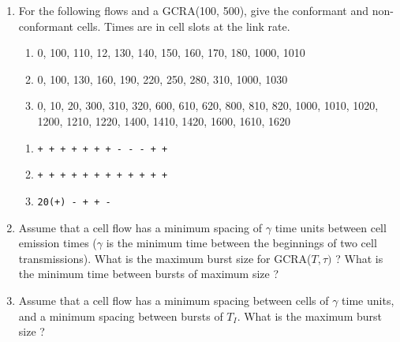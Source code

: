 \begin{problem}
\begin{enumerate}
        \item For the following flows and a GCRA(100, 500), give the conformant and
  non-conformant cells. Times are in cell slots at the link rate.
  \begin{enumerate}
        \item  0, 100, 110, 12, 130, 140, 150, 160, 170, 180, 1000, 1010
        \item  0, 100, 130, 160, 190, 220, 250, 280, 310, 1000, 1030
        \item  0, 10, 20, 300, 310, 320, 600, 610, 620, 800, 810, 820, 1000,
        1010, 1020, 1200, 1210, 1220, 1400, 1410, 1420, 1600, 1610, 1620
    \end{enumerate}

   \ifsol
        \begin{enumerate}
        \item  \texttt{+ + + + + + + - - - + +}
        \item  \texttt{+ + + + + + + + + + + +}
        \item  \texttt{20(+) - + + -}
        \end{enumerate}
\fi

        \item Assume that a cell flow has a minimum spacing of $\gamma$
        time units between cell emission times ($\gamma$ is the minimum
        time between the beginnings of two cell transmissions).  What is
        the maximum burst size for GCRA($T, \tau)$ ?  What is the minimum
        time between bursts of maximum size ?

        \item Assume that a cell flow has a minimum spacing between cells of
        $\gamma$ time units, and a minimum spacing between bursts of
        $T_{I}$. What is the maximum burst size ?

\end{enumerate}
\end{problem}
